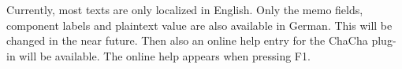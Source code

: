 \begin{description}[style=nextline]
\item[Localization and online help]

Currently, most texts are only localized in English. Only the memo fields, component labels and plaintext value are also available in German. 
This will be changed in the near future. Then also an online help entry for the ChaCha plug-in will be available. The online help appears when pressing F1.

\end{description}

